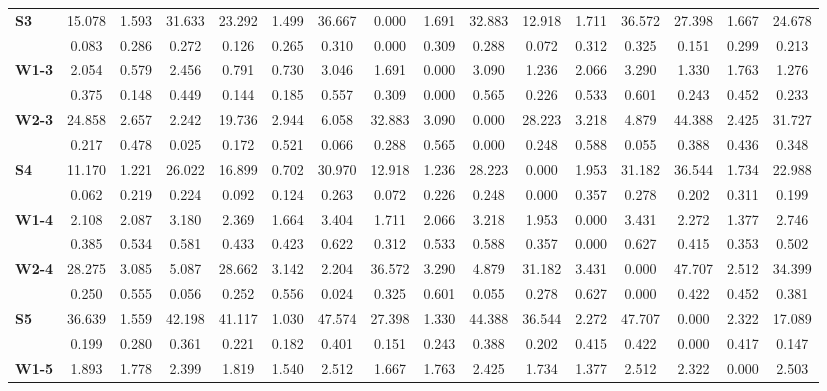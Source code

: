 \begin{table*}[h!]
\begin{center}
\begin{tabular}{| l || c | c | c || c | c | c || c | c | c || c | c | c || c | c | c |}
{\bf S3} & 15.078 & 1.593 & 31.633 & 23.292 & 1.499 & 36.667 & 0.000 & 1.691 & 32.883 & 12.918 & 1.711 & 36.572 & 27.398 & 1.667 & 24.678 \\
 & 0.083  & 0.286  & 0.272  & 0.126  & 0.265  & 0.310  & 0.000  & 0.309  & 0.288  & 0.072  & 0.312  & 0.325  & 0.151  & 0.299  & 0.213 \\\hline
{\bf W1-3} & 2.054 & 0.579 & 2.456 & 0.791 & 0.730 & 3.046 & 1.691 & 0.000 & 3.090 & 1.236 & 2.066 & 3.290 & 1.330 & 1.763 & 1.276 \\
 & 0.375  & 0.148  & 0.449  & 0.144  & 0.185  & 0.557  & 0.309  & 0.000  & 0.565  & 0.226  & 0.533  & 0.601  & 0.243  & 0.452  & 0.233 \\\hline
{\bf W2-3} & 24.858 & 2.657 & 2.242 & 19.736 & 2.944 & 6.058 & 32.883 & 3.090 & 0.000 & 28.223 & 3.218 & 4.879 & 44.388 & 2.425 & 31.727 \\
 & 0.217  & 0.478  & 0.025  & 0.172  & 0.521  & 0.066  & 0.288  & 0.565  & 0.000  & 0.248  & 0.588  & 0.055  & 0.388  & 0.436  & 0.348 \\\hline\hline
{\bf S4} & 11.170 & 1.221 & 26.022 & 16.899 & 0.702 & 30.970 & 12.918 & 1.236 & 28.223 & 0.000 & 1.953 & 31.182 & 36.544 & 1.734 & 22.988 \\
 & 0.062  & 0.219  & 0.224  & 0.092  & 0.124  & 0.263  & 0.072  & 0.226  & 0.248  & 0.000  & 0.357  & 0.278  & 0.202  & 0.311  & 0.199 \\\hline
{\bf W1-4} & 2.108 & 2.087 & 3.180 & 2.369 & 1.664 & 3.404 & 1.711 & 2.066 & 3.218 & 1.953 & 0.000 & 3.431 & 2.272 & 1.377 & 2.746 \\
 & 0.385  & 0.534  & 0.581  & 0.433  & 0.423  & 0.622  & 0.312  & 0.533  & 0.588  & 0.357  & 0.000  & 0.627  & 0.415  & 0.353  & 0.502 \\\hline
{\bf W2-4} & 28.275 & 3.085 & 5.087 & 28.662 & 3.142 & 2.204 & 36.572 & 3.290 & 4.879 & 31.182 & 3.431 & 0.000 & 47.707 & 2.512 & 34.399 \\
 & 0.250  & 0.555  & 0.056  & 0.252  & 0.556  & 0.024  & 0.325  & 0.601  & 0.055  & 0.278  & 0.627  & 0.000  & 0.422  & 0.452  & 0.381 \\\hline\hline
{\bf S5} & 36.639 & 1.559 & 42.198 & 41.117 & 1.030 & 47.574 & 27.398 & 1.330 & 44.388 & 36.544 & 2.272 & 47.707 & 0.000 & 2.322 & 17.089 \\
 & 0.199  & 0.280  & 0.361  & 0.221  & 0.182  & 0.401  & 0.151  & 0.243  & 0.388  & 0.202  & 0.415  & 0.422  & 0.000  & 0.417  & 0.147 \\\hline
{\bf W1-5} & 1.893 & 1.778 & 2.399 & 1.819 & 1.540 & 2.512 & 1.667 & 1.763 & 2.425 & 1.734 & 1.377 & 2.512 & 2.322 & 0.000 & 2.503 \\

\end{tabular}
\end{center}
\end{table*}
